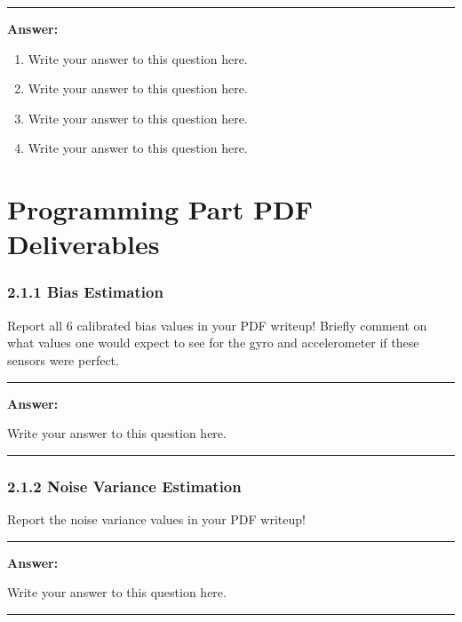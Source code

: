\documentclass[conference]{styles/acmsiggraph}
\newenvironment{answer}{}{}
\begin{document}
\begin{answer}
\rule{\textwidth}{0.4pt}
\textbf{Answer:}

\begin{enumerate}[label=(\roman*)]
\item Write your answer to this question here.

\item Write your answer to this question here.

\item Write your answer to this question here.

\item Write your answer to this question here.
\end{enumerate}
\end{answer}


\section{Programming Part PDF Deliverables}
\subsubsection*{2.1.1 Bias Estimation} 
Report all 6 calibrated bias values in your PDF writeup! Briefly comment on what values one would expect to see for the gyro and accelerometer if these sensors were perfect.

\begin{answer}
\rule{\textwidth}{0.4pt}
	
	\textbf{Answer:}
	
	Write your answer to this question here.

\rule{\textwidth}{0.4pt}
\end{answer}

\subsubsection*{2.1.2 Noise Variance Estimation} 
Report the noise variance values in your PDF writeup!

\begin{answer}
\rule{\textwidth}{0.4pt}
	
	\textbf{Answer:}
	
	Write your answer to this question here.

\rule{\textwidth}{0.4pt}
\end{answer}
\end{document}
